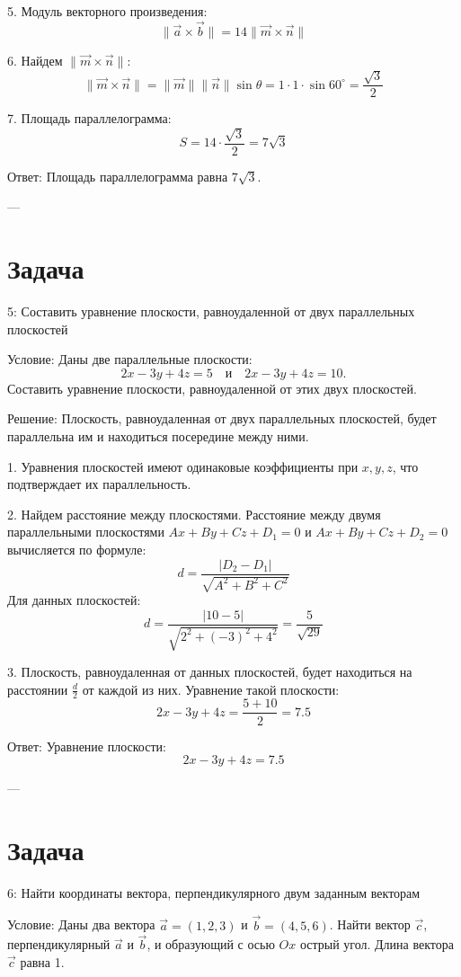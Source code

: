 \documentclass[a4paper,14pt]{extreport} %
\begin{document}
5. Модуль векторного произведения:
   \[
   \| \vec{a} \times \vec{b} \| = 14 \| \vec{m} \times \vec{n} \|
   \]

6. Найдем \( \| \vec{m} \times \vec{n} \| \):
   \[
   \| \vec{m} \times \vec{n} \| = \| \vec{m} \| \| \vec{n} \| \sin \theta = 1 \cdot 1 \cdot \sin 60^\circ = \frac{\sqrt{3}}{2}
   \]

7. Площадь параллелограмма:
   \[
   S = 14 \cdot \frac{\sqrt{3}}{2} = 7\sqrt{3}
   \]

 Ответ:   
Площадь параллелограмма равна \( 7\sqrt{3} \).

---

    \section*{Задача}5: Составить уравнение плоскости, равноудаленной от двух параллельных плоскостей

 Условие:   
Даны две параллельные плоскости:
\[
2x - 3y + 4z = 5 \quad \text{и} \quad 2x - 3y + 4z = 10.
\]
Составить уравнение плоскости, равноудаленной от этих двух плоскостей.

 Решение:   
Плоскость, равноудаленная от двух параллельных плоскостей, будет параллельна им и находиться посередине между ними.

1. Уравнения плоскостей имеют одинаковые коэффициенты при \( x, y, z \), что подтверждает их параллельность.

2. Найдем расстояние между плоскостями.  
   Расстояние между двумя параллельными плоскостями \( Ax + By + Cz + D_1 = 0 \) и \( Ax + By + Cz + D_2 = 0 \) вычисляется по формуле:
   \[
   d = \frac{|D_2 - D_1|}{\sqrt{A^2 + B^2 + C^2}}
   \]
   Для данных плоскостей:
   \[
   d = \frac{|10 - 5|}{\sqrt{2^2 + (-3)^2 + 4^2}} = \frac{5}{\sqrt{29}}
   \]

3. Плоскость, равноудаленная от данных плоскостей, будет находиться на расстоянии \( \frac{d}{2} \) от каждой из них.  
   Уравнение такой плоскости:
   \[
   2x - 3y + 4z = \frac{5 + 10}{2} = 7.5
   \]

 Ответ:   
Уравнение плоскости:
\[
2x - 3y + 4z = 7.5
\]

---

    \section*{Задача}6: Найти координаты вектора, перпендикулярного двум заданным векторам

 Условие:   
Даны два вектора \( \vec{a} = (1, 2, 3) \) и \( \vec{b} = (4, 5, 6) \).  
Найти вектор \( \vec{c} \), перпендикулярный \( \vec{a} \) и \( \vec{b} \), и образующий с осью \( Ox \) острый угол. Длина вектора \( \vec{c} \) равна 1.
\end{document}
